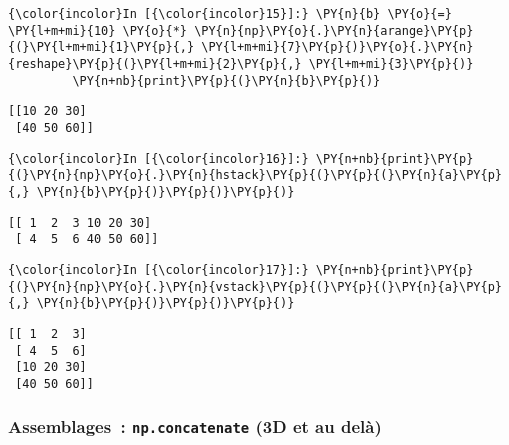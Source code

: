     \begin{Verbatim}[commandchars=\\\{\}]
{\color{incolor}In [{\color{incolor}15}]:} \PY{n}{b} \PY{o}{=} \PY{l+m+mi}{10} \PY{o}{*} \PY{n}{np}\PY{o}{.}\PY{n}{arange}\PY{p}{(}\PY{l+m+mi}{1}\PY{p}{,} \PY{l+m+mi}{7}\PY{p}{)}\PY{o}{.}\PY{n}{reshape}\PY{p}{(}\PY{l+m+mi}{2}\PY{p}{,} \PY{l+m+mi}{3}\PY{p}{)}
         \PY{n+nb}{print}\PY{p}{(}\PY{n}{b}\PY{p}{)}
\end{Verbatim}


    \begin{Verbatim}[commandchars=\\\{\}]
[[10 20 30]
 [40 50 60]]

    \end{Verbatim}

    \begin{Verbatim}[commandchars=\\\{\}]
{\color{incolor}In [{\color{incolor}16}]:} \PY{n+nb}{print}\PY{p}{(}\PY{n}{np}\PY{o}{.}\PY{n}{hstack}\PY{p}{(}\PY{p}{(}\PY{n}{a}\PY{p}{,} \PY{n}{b}\PY{p}{)}\PY{p}{)}\PY{p}{)}
\end{Verbatim}


    \begin{Verbatim}[commandchars=\\\{\}]
[[ 1  2  3 10 20 30]
 [ 4  5  6 40 50 60]]

    \end{Verbatim}

    \begin{Verbatim}[commandchars=\\\{\}]
{\color{incolor}In [{\color{incolor}17}]:} \PY{n+nb}{print}\PY{p}{(}\PY{n}{np}\PY{o}{.}\PY{n}{vstack}\PY{p}{(}\PY{p}{(}\PY{n}{a}\PY{p}{,} \PY{n}{b}\PY{p}{)}\PY{p}{)}\PY{p}{)}
\end{Verbatim}


    \begin{Verbatim}[commandchars=\\\{\}]
[[ 1  2  3]
 [ 4  5  6]
 [10 20 30]
 [40 50 60]]

    \end{Verbatim}

    \hypertarget{assemblages-np.concatenate-3d-et-au-deluxe0}{%
\subsubsection{\texorpdfstring{Assemblages~: \texttt{np.concatenate} (3D
et au
delà)}{Assemblages~: np.concatenate (3D et au delà)}}\label{assemblages-np.concatenate-3d-et-au-deluxe0}}

